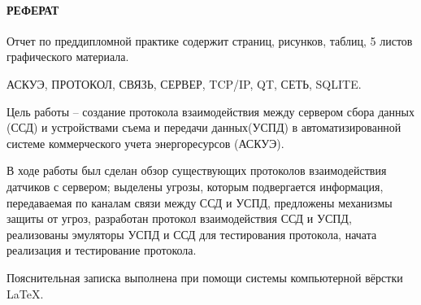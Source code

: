 \newpage
{}
\paragraph*{\hfill РЕФЕРАТ \hfill}
Отчет по преддипломной практике содержит  страниц,  рисунков,  таблиц, 5 листов графического материала.

АСКУЭ, ПРОТОКОЛ, СВЯЗЬ, СЕРВЕР, TCP/IP, QT, СЕТЬ, SQLITE.

Цель работы -- создание протокола взаимодействия между сервером сбора данных (ССД) и устройствами съема и передачи данных(УСПД) в автоматизированной системе коммерческого учета энергоресурсов (АСКУЭ).

В ходе работы был сделан обзор существующих протоколов взаимодействия датчиков с сервером; выделены угрозы, которым подвергается информация, передаваемая по каналам связи между ССД и УСПД, предложены механизмы защиты от угроз, разработан протокол взаимодействия ССД и УСПД, реализованы эмуляторы УСПД и ССД для тестирования протокола, начата реализация и тестирование протокола.  %

Пояснительная записка выполнена при помощи системы компьютерной вёрстки \LaTeX.